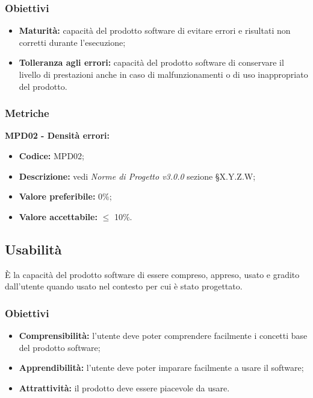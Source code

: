 \subsubsection{Obiettivi}
\begin{itemize}
    \item \textbf{Maturità:} capacità del prodotto software di evitare errori e risultati non corretti durante l’esecuzione;
    \item \textbf{Tolleranza agli errori:} capacità del prodotto software di conservare il livello di prestazioni
          anche in caso di malfunzionamenti o di uso inappropriato del prodotto.
\end{itemize}
\subsubsection{Metriche}
\textbf{MPD02 - Densità errori:}
\begin{itemize}
    \item \textbf{Codice:} MPD02;
    \item \textbf{Descrizione:} vedi \textit{Norme di Progetto v3.0.0} sezione \S X.Y.Z.W;
    \item \textbf{Valore preferibile:} 0\%;
    \item \textbf{Valore accettabile:} $\leq$ 10\%.
\end{itemize}
\subsection{Usabilità}
È la capacità del prodotto software di essere compreso, appreso, usato e gradito dall’utente quando usato nel contesto per cui è stato progettato.
\subsubsection{Obiettivi}
\begin{itemize}
    \item \textbf{Comprensibilità:} l'utente deve poter comprendere facilmente i concetti base del prodotto software;
    \item \textbf{Apprendibilità:} l'utente deve poter imparare facilmente a usare il software;
    \item \textbf{Attrattività:} il prodotto deve essere piacevole da usare.
\end{itemize}
